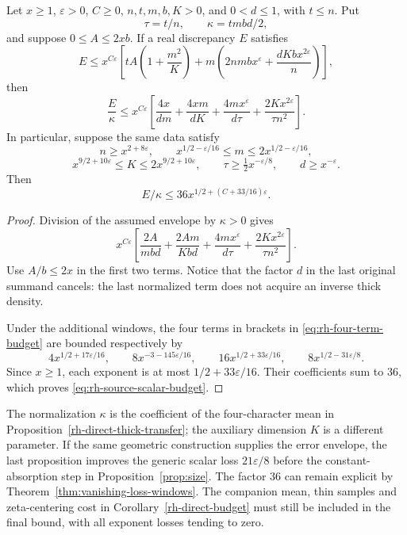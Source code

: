 \begin{proposition}
\label{prop:rh-four-term-budget}
Let $x\ge1$, $\varepsilon>0$, $C\ge0$, $n,t,m,b,K>0$, and
$0<d\le1$, with $t\le n$. Put
\[
 \tau=t/n,\qquad \kappa=tmbd/2,
\]
and suppose $0\le A\le2xb$. If a real discrepancy $E$ satisfies
\[
 E\le x^{C\varepsilon}
 \left[tA\left(1+\frac{m^2}{K}\right)
       +m\left(2nmbx^\varepsilon+
                         \frac{dKbx^{2\varepsilon}}n\right)\right],
\]
then
\begin{equation}\label{eq:rh-four-term-budget}
 \frac E\kappa\le x^{C\varepsilon}
 \left[\frac{4x}{dm}+\frac{4xm}{dK}
       +\frac{4mx^\varepsilon}{d\tau}
       +\frac{2Kx^{2\varepsilon}}{\tau n^2}\right].
\end{equation}
In particular, suppose the same data satisfy
\[
 n\ge x^{2+8\varepsilon},\qquad
 x^{1/2-\varepsilon/16}\le m\le2x^{1/2-\varepsilon/16},
\]
\[
 x^{9/2+10\varepsilon}\le K\le2x^{9/2+10\varepsilon},\qquad
 \tau\ge\tfrac12x^{-\varepsilon/8},\qquad d\ge x^{-\varepsilon}.
\]
Then
\begin{equation}\label{eq:rh-source-scalar-budget}
                   E/\kappa\le36x^{1/2+(C+33/16)\varepsilon}.
\end{equation}
\end{proposition}
\begin{proof}
Division of the assumed envelope by $\kappa>0$ gives
\[
 x^{C\varepsilon}\left[
 \frac{2A}{mbd}+\frac{2Am}{Kbd}
       +\frac{4mx^\varepsilon}{d\tau}
       +\frac{2Kx^{2\varepsilon}}{\tau n^2}\right].
\]
Use $A/b\le2x$ in the first two terms. Notice that the factor $d$
in the last original summand cancels: the last normalized term does
not acquire an inverse thick density.

Under the additional windows, the four terms in brackets in
\eqref{eq:rh-four-term-budget} are bounded respectively by
\[
 4x^{1/2+17\varepsilon/16},\qquad
 8x^{-3-145\varepsilon/16},\qquad
 16x^{1/2+33\varepsilon/16},\qquad
 8x^{1/2-31\varepsilon/8}.
\]
Since $x\ge1$, each exponent is at most
$1/2+33\varepsilon/16$. Their coefficients sum to $36$,
which proves \eqref{eq:rh-source-scalar-budget}.
\end{proof}

The normalization $\kappa$ is the coefficient of the four-character
mean in Proposition~\ref{rh-direct-thick-transfer}; the auxiliary
dimension $K$ is a different parameter. If the same geometric
construction supplies the error envelope, the last proposition
improves the generic scalar loss $21\varepsilon/8$ before the
constant-absorption step in Proposition~\ref{prop:size}. The factor
$36$ can remain explicit by Theorem~\ref{thm:vanishing-loss-windows}.
The companion mean, thin samples and zeta-centering cost in
Corollary~\ref{rh-direct-budget} must still be included in the final
bound, with all exponent losses tending to zero.


